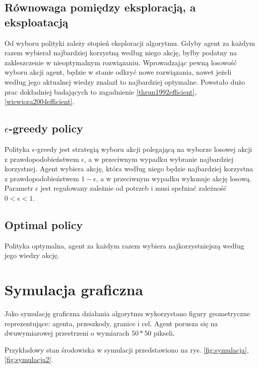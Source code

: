 \subsection{Równowaga pomiędzy eksploracją, a eksploatacją}
Od wyboru polityki zależy stopień eksploracji algorytmu. Gdyby agent za każdym razem wybierał najbardziej korzystną według niego akcję, byłby podatny na zakleszczenie w nieoptymalnym rozwiązaniu. Wprowadzając pewną losowość wyboru akcji agent, będzie w stanie odkryć nowe rozwiązania, nawet jeżeli według jego aktualnej wiedzy znalazł to najbardziej optymalne. Powstało dużo prac dokładniej badających to zagadnienie \ref{thrun1992efficient}, \ref{wiewiora2004efficient}.

\subsection{$\epsilon$-greedy policy}

Polityka $\epsilon$-greedy jest strategią wyboru akcji polegającą na wyborze losowej akcji z prawdopodobieństwem $\epsilon$, a w przeciwnym wypadku wybranie najbardziej korzystnej. Agent wybiera akcję, która według niego będzie najbardziej korzystna z prawdopodobieństwem $1-\epsilon$, a w przeciwnym wypadku wykonuje akcję losową. Parametr $\epsilon$ jest regulowany zależnie od potrzeb i musi spełniać zależność $0 < \epsilon < 1$.

\subsection{Optimal policy}

Polityka optymalna, agent za każdym razem wybiera najkorzystniejszą według jego wiedzy akcję.

\section{Symulacja graficzna}
\label{sec:symulacjagraficzna}

Jako symulację graficzna działania algorytmu wykorzystano figury geometryczne reprezentujące: agenta, przeszkody, 
granice i cel.
Agent porusza się na dwuwymiarowej przestrzeni o wymiarach $50*50$ pikseli.

Przykładowy stan środowiska w symulacji przedstawiono na rys. \ref{fig:symulacja}, \ref{fig:symulacja2}.

